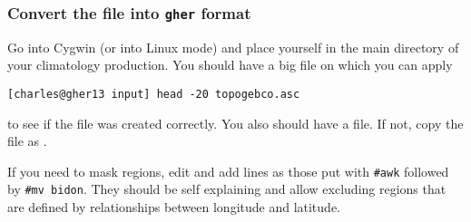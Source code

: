 %


\subsubsection{Convert the file into \texttt{gher} format}

%
%
%
%

Go into Cygwin (or into Linux mode) and place yourself in the main directory of your climatology production. You should have a big  file on which you can apply

\begin{lstlisting}[style=Bash]
[charles@gher13 input] head -20 topogebco.asc
\end{lstlisting}

to see if the file was created correctly. You also should have a  file. If not, copy the  file as .

If you need to mask regions, edit  and add lines as those put with {\tt \#awk} followed by {\tt \#mv bidon}. They should be self explaining and allow excluding regions that are defined by relationships between longitude and latitude. 

